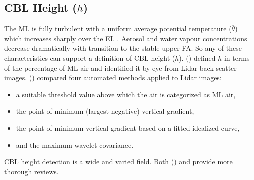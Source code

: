 \subsection{CBL Height ($h$)}
\label{subsec:cblh}

The \acs{ML} is fully turbulent with a uniform average potential temperature ($\overline{\theta}$) which increases sharply over the \acs{EL} . Aerosol and water vapour concentrations decrease dramatically with transition to the stable upper \acs{FA}.  So any of these characteristics can support a definition of \acs{CBL} height ($h$).  \citeauthor{StullNelEl} (\citeyear{StullNelEl}) defined $h$ in terms of the percentage of \acs{ML} air and identified it by eye from Lidar back-scatter images.  \citeauthor{Traum11} (\citeyear{Traum11}) compared four automated methods applied to Lidar images:
 
\begin{itemize}
\item{a suitable threshold value above which the air is categorized as \acs{ML} air,}  
\item{the point of minimum (largest negative) vertical gradient,}
\item{the point of minimum vertical gradient based on a fitted idealized curve,}
 \item{and the maximum wavelet covariance.}  
\end{itemize}

\acs{CBL} height detection is a wide and varied field.  Both \citeauthor{BrooksFowler2} (\citeyear{BrooksFowler2}) and \citeauthor{Traum11} \citeyear{Traum11} provide more thorough reviews.\\

